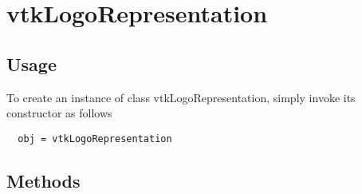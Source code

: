 \section{vtkLogoRepresentation}

\subsection{Usage}


To create an instance of class vtkLogoRepresentation, simply
invoke its constructor as follows
\begin{verbatim}
  obj = vtkLogoRepresentation
\end{verbatim}
\subsection{Methods}

